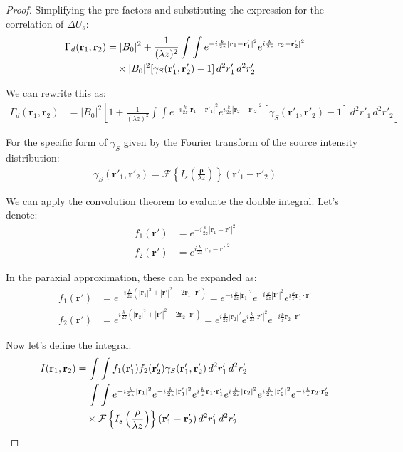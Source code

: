 \documentclass[a4paper,12pt]{article}
\begin{document}
\begin{proof}
Simplifying the pre-factors and substituting the expression for the correlation of $\Delta U_s$:
\begin{align}
\Gamma_d(\mathbf{r}_1, \mathbf{r}_2) &= |B_0|^2 + \frac{1}{(\lambda z)^2} \int\int e^{-i\frac{k}{2z}|\mathbf{r}_1 - \mathbf{r}'_1|^2} e^{i\frac{k}{2z}|\mathbf{r}_2 - \mathbf{r}'_2|^2} \\
&\quad \times |B_0|^2 [\gamma_S(\mathbf{r}'_1, \mathbf{r}'_2) - 1] \, d^2r'_1 \, d^2r'_2 \notag
\end{align}

We can rewrite this as:
\begin{align}
\Gamma_d(\mathbf{r}_1, \mathbf{r}_2) &= |B_0|^2 \left[1 + \frac{1}{(\lambda z)^2} \int\int e^{-i\frac{k}{2z}|\mathbf{r}_1 - \mathbf{r}'_1|^2} e^{i\frac{k}{2z}|\mathbf{r}_2 - \mathbf{r}'_2|^2} [\gamma_S(\mathbf{r}'_1, \mathbf{r}'_2) - 1] \, d^2r'_1 \, d^2r'_2 \right]
\end{align}

For the specific form of $\gamma_S$ given by the Fourier transform of the source intensity distribution:
\begin{align}
\gamma_S(\mathbf{r}'_1, \mathbf{r}'_2) = \mathcal{F}\left\{I_s\left(\frac{\mathbf{\rho}}{\lambda z}\right)\right\}(\mathbf{r}'_1 - \mathbf{r}'_2)
\end{align}

We can apply the convolution theorem to evaluate the double integral. Let's denote:
\begin{align}
f_1(\mathbf{r}') &= e^{-i\frac{k}{2z}|\mathbf{r}_1 - \mathbf{r}'|^2} \\
f_2(\mathbf{r}') &= e^{i\frac{k}{2z}|\mathbf{r}_2 - \mathbf{r}'|^2}
\end{align}

In the paraxial approximation, these can be expanded as:
\begin{align}
f_1(\mathbf{r}') &= e^{-i\frac{k}{2z}(|\mathbf{r}_1|^2 + |\mathbf{r}'|^2 - 2\mathbf{r}_1 \cdot \mathbf{r}')} = e^{-i\frac{k}{2z}|\mathbf{r}_1|^2} e^{-i\frac{k}{2z}|\mathbf{r}'|^2} e^{i\frac{k}{z}\mathbf{r}_1 \cdot \mathbf{r}'} \\
f_2(\mathbf{r}') &= e^{i\frac{k}{2z}(|\mathbf{r}_2|^2 + |\mathbf{r}'|^2 - 2\mathbf{r}_2 \cdot \mathbf{r}')} = e^{i\frac{k}{2z}|\mathbf{r}_2|^2} e^{i\frac{k}{2z}|\mathbf{r}'|^2} e^{-i\frac{k}{z}\mathbf{r}_2 \cdot \mathbf{r}'}
\end{align}

Now let's define the integral:
\begin{align}
I(\mathbf{r}_1, \mathbf{r}_2) &= \int\int f_1(\mathbf{r}'_1) f_2(\mathbf{r}'_2) \gamma_S(\mathbf{r}'_1, \mathbf{r}'_2) \, d^2r'_1 \, d^2r'_2 \\
&= \int\int e^{-i\frac{k}{2z}|\mathbf{r}_1|^2} e^{-i\frac{k}{2z}|\mathbf{r}'_1|^2} e^{i\frac{k}{z}\mathbf{r}_1 \cdot \mathbf{r}'_1} e^{i\frac{k}{2z}|\mathbf{r}_2|^2} e^{i\frac{k}{2z}|\mathbf{r}'_2|^2} e^{-i\frac{k}{z}\mathbf{r}_2 \cdot \mathbf{r}'_2} \notag \\
&\quad \times \mathcal{F}\left\{I_s\left(\frac{\mathbf{\rho}}{\lambda z}\right)\right\}(\mathbf{r}'_1 - \mathbf{r}'_2) \, d^2r'_1 \, d^2r'_2 \notag
\end{align}


\end{proof}
\end{document}
